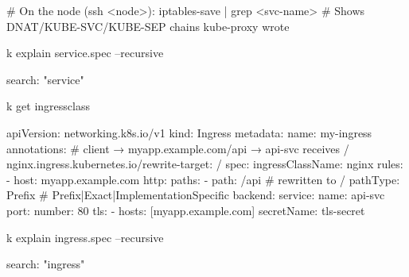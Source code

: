 \begin{tcbitemize}[
  raster columns=4, raster equal height=rows,
  blanker, cheat subtitle
]
\begin{tcbitemize}[
      raster columns=1, raster equal height=rows,
      blanker, cheat subtitle
    ]
        \begin{cheatcodebash}
# On the node (ssh <node>):
iptables-save | grep <svc-name>
# Shows DNAT/KUBE-SVC/KUBE-SEP chains kube-proxy wrote
        \end{cheatcodebash}

        \begin{cheatcodebash}
k explain service.spec --recursive
        \end{cheatcodebash}

        \begin{cheatcodebash}
search: "service"
        \end{cheatcodebash}

    \tcbitem
        \begin{cheatcodebash}
        k get ingressclass
        \end{cheatcodebash}

        \begin{cheatcodebash}
        apiVersion: networking.k8s.io/v1
        kind: Ingress
        metadata:
          name: my-ingress
          annotations:
            # client → myapp.example.com/api →  api-svc receives /
            nginx.ingress.kubernetes.io/rewrite-target: /
        spec:
          ingressClassName: nginx
          rules:
          - host: myapp.example.com
            http:
              paths:
              - path: /api  # rewritten to /
                pathType: Prefix # Prefix|Exact|ImplementationSpecific
                backend:
                  service:
                    name: api-svc
                    port: {number: 80}
          tls:
          - hosts: [myapp.example.com]
            secretName: tls-secret
        \end{cheatcodebash}

        \begin{cheatcodebash}
        k explain ingress.spec --recursive
        \end{cheatcodebash}

        \begin{cheatcodebash}
        search: "ingress"
        \end{cheatcodebash}



\end{tcbitemize}
\end{tcbitemize}
